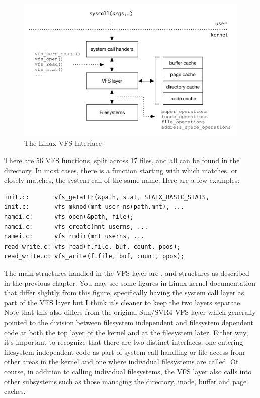 \begin{figure}[h]
	\includegraphics[scale=0.6]{figures/vfs-functions.pdf}
	\centering
	\caption{The Linux VFS Interface}
	\label{fig:vfs-functions}
\end{figure}

There are 56 VFS functions, split across 17 files, and all can be found in the  directory. In most cases, there is a function starting with  which matches, or closely matches, the system call of the same name. Here are a few examples:

\begin{lstlisting}
init.c:       vfs_getattr(&path, stat, STATX_BASIC_STATS,
init.c:       vfs_mknod(mnt_user_ns(path.mnt), ...
namei.c:      vfs_open(&path, file);
namei.c:      vfs_create(mnt_userns, ...
namei.c:      vfs_rmdir(mnt_userns, ...
read_write.c: vfs_read(f.file, buf, count, ppos);
read_write.c: vfs_write(f.file, buf, count, ppos);
\end{lstlisting}

\noindent
The main structures handled in the VFS layer are ,  and  structures as described in the previous chapter. You may see some figures in Linux kernel documentation that differ slightly from this figure, specifically having the system call layer as part of the VFS layer but I think it's cleaner to keep the two layers separate. Note that this also differs from the original Sun/SVR4 VFS layer which generally pointed to the division between filesystem independent and filesystem dependent code at both the top layer of the kernel and at the filesystem later. Either way, it's important to recognize that there are two distinct interfaces, one entering filesystem independent code as part of system call handling or file access from other areas in the kernel and one where individual filesystems are called. Of course, in addition to calling individual filesystems, the VFS layer also calls into other subsystems such as those managing the directory, inode, buffer and page caches.

